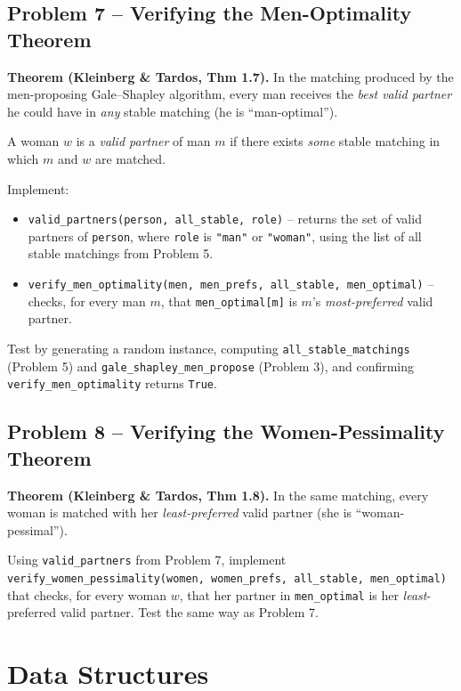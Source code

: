 \documentclass[11pt]{article}
\begin{document}
\subsection*{Problem 7 -- Verifying the Men-Optimality Theorem}

\textbf{Theorem (Kleinberg \& Tardos, Thm 1.7).} In the matching produced by the
men-proposing Gale--Shapley algorithm, every man receives the \emph{best valid partner}
he could have in \emph{any} stable matching (he is ``man-optimal'').

A woman $w$ is a \emph{valid partner} of man $m$ if there exists \emph{some} stable
matching in which $m$ and $w$ are matched.

Implement:
\begin{itemize}
    \item \texttt{valid\_partners(person, all\_stable, role)} -- returns the set of valid
    partners of \texttt{person}, where \texttt{role} is \texttt{"man"} or
    \texttt{"woman"}, using the list of all stable matchings from Problem 5.
    \item \texttt{verify\_men\_optimality(men, men\_prefs, all\_stable, men\_optimal)} --
    checks, for every man $m$, that \texttt{men\_optimal[m]} is $m$'s
    \emph{most-preferred} valid partner.
\end{itemize}
Test by generating a random instance, computing \texttt{all\_stable\_matchings} (Problem
5) and \texttt{gale\_shapley\_men\_propose} (Problem 3), and confirming
\texttt{verify\_men\_optimality} returns \texttt{True}.

\subsection*{Problem 8 -- Verifying the Women-Pessimality Theorem}

\textbf{Theorem (Kleinberg \& Tardos, Thm 1.8).} In the same matching, every woman is
matched with her \emph{least-preferred} valid partner (she is ``woman-pessimal'').

Using \texttt{valid\_partners} from Problem 7, implement
\texttt{verify\_women\_pessimality(women, women\_prefs, all\_stable, men\_optimal)} that
checks, for every woman $w$, that her partner in \texttt{men\_optimal} is her
\emph{least}-preferred valid partner. Test the same way as Problem 7.

\newpage
\section{Data Structures}
\end{document}
